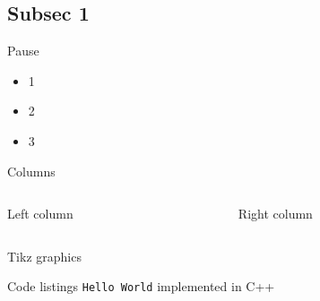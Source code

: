 \documentclass[compress,aspectratio=169]{beamer}
\begin{document}
\subsection{Subsec 1} %
\begin{frame}{Pause}
    \begin{itemize}
        \item 1
        \pause  %
        \item 2
        \pause
        \item 3
    \end{itemize}
\end{frame}

\begin{frame}{Columns}
    \begin{columns}
    \begin{column}{0.5\textwidth}
    Left column
    \end{column}
    \begin{column}{0.5\textwidth}
    Right column %
    \end{column}
    \end{columns}
\end{frame}

\begin{frame}{Tikz graphics}
\end{frame}

\begin{frame}[fragile]{Code listings}
    \texttt{Hello World} implemented in C++
    \begin{tcolorbox}[title=C++]
        \footnotesize\inputminted[xleftmargin=1em,linenos]{c++}{../assets/hello-world.cpp}
    \end{tcolorbox}

\end{frame}
\end{document}
